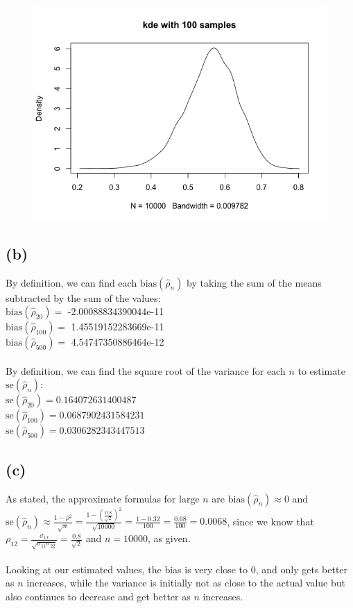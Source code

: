 \documentclass{article}
\begin{document}
{\begin{figure}[t!]
\end{figure}
\begin{figure}[t!]
  \centering
  \includegraphics[width=450pt]{hw5_2a_100.png}
\end{figure}
\newpage

\subsection*{(b)}

By definition, we can find each $\text{bias}(\hat{\rho}_n)$ by taking the sum of the means subtracted by the sum of the values: \\
$\text{bias}(\hat{\rho}_{20}) = 
$ -2.00088834390044e-11 \\
$\text{bias}(\hat{\rho}_{100}) = $ 1.45519152283669e-11 \\
$\text{bias}(\hat{\rho}_{500}) = $ 4.54747350886464e-12 \\ \\
By definition, we can find the square root of the variance for each $n$ to estimate $\text{se}(\hat{\rho}_n)$: \\
$\text{se}(\hat{\rho}_{20}) = 0.164072631400487$ \\
$\text{se}(\hat{\rho}_{100}) = 0.0687902431584231$ \\
$\text{se}(\hat{\rho}_{500}) = 0.0306282343447513$

\subsection*{(c)}

As stated, the approximate formulas for large $n$ are $\text{bias}(\hat{\rho}_n) \approx 0$ and $\text{se}(\hat{\rho}_n) \approx \frac{1-\rho^2}{\sqrt{n}} = \frac{1 - (\frac{0.8}{\sqrt{2}})^2}{\sqrt{10000}} = \frac{1 - 0.32}{100} = \frac{0.68}{100} = 0.0068$, since we know that $\rho_{12} = \frac{\sigma_{12}}{\sqrt{\sigma_{11}\sigma_{22}}} = \frac{0.8}{\sqrt{2}}$ and $n = 10000$, as given. \\ \\
Looking at our estimated values, the bias is very close to 0, and only gets better as $n$ increases, while the variance is initially not as close to the actual value but also continues to decrease and get better as $n$ increases.

}
\end{document}
